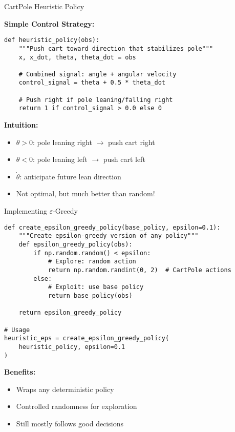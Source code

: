 \documentclass[aspectratio=169,10pt]{beamer}
\begin{document}
\begin{frame}[fragile]{CartPole Heuristic Policy}

\textbf{Simple Control Strategy:}

\begin{lstlisting}
def heuristic_policy(obs):
    """Push cart toward direction that stabilizes pole"""
    x, x_dot, theta, theta_dot = obs
    
    # Combined signal: angle + angular velocity
    control_signal = theta + 0.5 * theta_dot
    
    # Push right if pole leaning/falling right
    return 1 if control_signal > 0.0 else 0
\end{lstlisting}

\vfill

\textbf{Intuition:}
\begin{itemize}
    \item $\theta > 0$: pole leaning right $\rightarrow$ push cart right
    \item $\theta < 0$: pole leaning left $\rightarrow$ push cart left  
    \item $\dot{\theta}$: anticipate future lean direction
    \item Not optimal, but much better than random!
\end{itemize}

\end{frame}

\begin{frame}[fragile]{Implementing $\varepsilon$-Greedy}

\begin{lstlisting}
def create_epsilon_greedy_policy(base_policy, epsilon=0.1):
    """Create epsilon-greedy version of any policy"""
    def epsilon_greedy_policy(obs):
        if np.random.random() < epsilon:
            # Explore: random action
            return np.random.randint(0, 2)  # CartPole actions
        else:
            # Exploit: use base policy
            return base_policy(obs)
    
    return epsilon_greedy_policy

# Usage
heuristic_eps = create_epsilon_greedy_policy(
    heuristic_policy, epsilon=0.1
)
\end{lstlisting}

\vfill

\textbf{Benefits:}
\begin{itemize}
    \item Wraps any deterministic policy
    \item Controlled randomness for exploration
    \item Still mostly follows good decisions
\end{itemize}

\end{frame}
\end{document}
